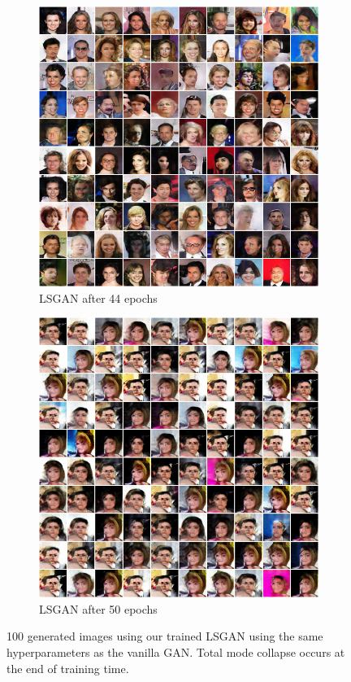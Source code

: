 \documentclass[table]{article}
\begin{document}
\begin{figure}[ht]
  \centering
  \begin{subfigure}{\textwidth}
    \centering
    \includegraphics[scale=0.38]{imgs/lsgan_epoch44}
    \caption{LSGAN after 44 epochs}
  \end{subfigure}

  \vspace*{3mm}
  \begin{subfigure}{\textwidth}
    \centering
    \includegraphics[scale=0.38]{imgs/lsgan_epoch50}
    \caption{LSGAN after 50 epochs}
  \end{subfigure}
  \caption{100 generated images using our trained LSGAN using the same hyperparameters as the vanilla GAN. Total mode collapse occurs at the end of training time.}
\end{figure}
\end{document}
